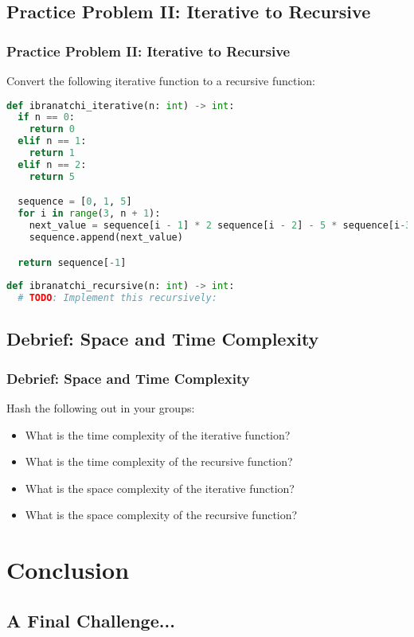 \documentclass[hyperref={colorlinks,citecolor=blue,linkcolor=blue,urlcolor=blue}]{beamer}
\begin{document}
\subsection{Practice Problem II: Iterative to Recursive}

\begin{frame}[fragile]
  \frametitle{Practice Problem II: Iterative to Recursive}
  
  Convert the following iterative function to a recursive function:

  \begin{lstlisting}[language=Python, style=mystyle]
def ibranatchi_iterative(n: int) -> int:
  if n == 0:
    return 0
  elif n == 1:
    return 1
  elif n == 2:
    return 5

  sequence = [0, 1, 5]
  for i in range(3, n + 1):
    next_value = sequence[i - 1] * 2 sequence[i - 2] - 5 * sequence[i-3]
    sequence.append(next_value)

  return sequence[-1]
 
def ibranatchi_recursive(n: int) -> int:
  # TODO: Implement this recursively:

  \end{lstlisting}
\end{frame}
\subsection{Debrief: Space and Time Complexity}
\begin{frame}
  \frametitle{Debrief: Space and Time Complexity}
  Hash the following out in your groups:
  \begin{itemize}
    \item What is the time complexity of the iterative function?
    \item What is the time complexity of the recursive function?
    \item What is the space complexity of the iterative function?
    \item What is the space complexity of the recursive function?
\end{itemize}
\end{frame}

\section{Conclusion}
\subsection{A Final Challenge...}
\end{document}

